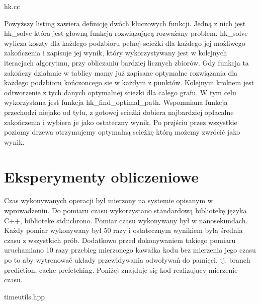 \documentclass[polish,polish,a4paper]{article}
\begin{document}

{hk.cc}

Powyższy listing zawiera definicję dwóch kluczowych funkcji. Jedną z nich jest hk\_solve która jest głowną funkcją rozwiązującą rozważany problem.
hk\_solve wylicza koszty dla każdego podzbioru pełnej scieżki dla każdego jej możliwego zakończenia i zapisuje jej wynik, który wykorzystywany jest w kolejnych iteracjach algorytmu,
przy obliczaniu bardziej licznych zbiorów. Gdy funkcja ta zakończy działanie w tablicy mamy już zapisane optymalne rozwiązania dla każdego podzbioru kończoncego sie w każdym z punktów.
Kolejnym krokiem jest odtworzenie z tych danych optymalnej scieżki dla całego grafu. W tym celu wykorzystana jest funkcja hk\_find\_optimal\_path.
Wspomniana funkcja przechodzi niejako od tyłu, z gotowej scieżki dobiera najbardziej opłacalne zakończenia i wybiera je jako ostateczny wynik. Po przjściu przez wszystkie poziomy
drzewa otrzymujemy optymalną scieżkę którą możemy zwrócić jako wynik.

\section{Eksperymenty obliczeniowe}
Czas wykonywanych operacji był mierzony na systemie opisanym w wprowadzeniu.
Do pomiaru czasu wykorzystano standardową bibliotekę języka C++, biblioteke std::chrono.
Pomiar czasu wykonywany był w nanosekundach. Każdy pomiar wykonywany był 50 razy i ostatecznym wynikiem była średnia czasu z wszystkich prób.
Dodatkowo przed dokonywaniem takiego pomiaru uruchamiano 10 razy przebieg mierzonego kawałka kodu bez mierzenia jego czasu po to aby wytrenować układy przewidywania odwoływań do pamięci,
tj. branch prediction, cache prefetching.
Poniżej znajduje się kod realizujący mierzenie czasu.


{timeutils.hpp}
\end{document}
